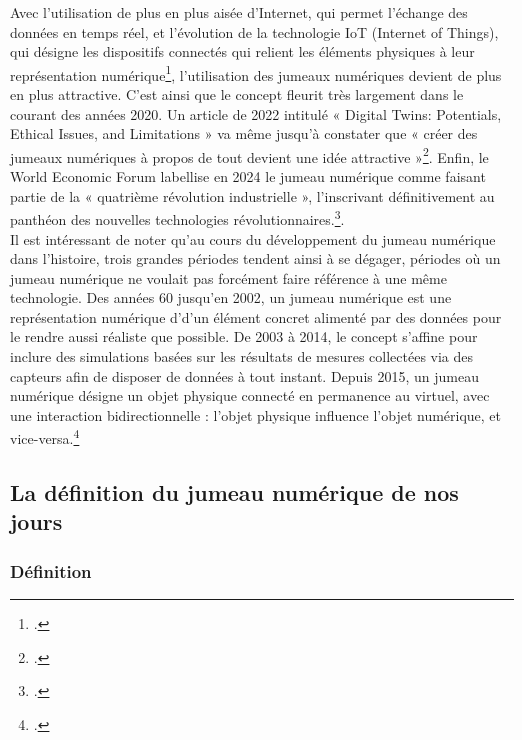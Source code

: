 Avec l'utilisation de plus en plus aisée d'Internet, qui permet l'échange des données en temps réel, et l'évolution de la technologie IoT (Internet of Things), qui désigne les dispositifs connectés qui relient les éléments physiques à leur représentation numérique\footcite{thermosJumeauNumeriqueConcept2024}, l'utilisation des jumeaux numériques devient de plus en plus attractive. C’est ainsi que le concept fleurit très largement dans le courant des années 2020. Un article de 2022 intitulé « Digital Twins: Potentials, Ethical Issues, and Limitations » va même jusqu'à constater que « créer des jumeaux numériques à propos de tout devient une idée attractive »\footcite{helbingDigitalTwinsPotentials2022}. Enfin, le World Economic Forum labellise en 2024 le jumeau numérique comme faisant partie de la « quatrième révolution industrielle », l’inscrivant définitivement au panthéon des nouvelles technologies révolutionnaires.\footcite{batagliaWhyTeamingIndustry2024}.\\

Il est intéressant de noter qu'au cours du développement du jumeau numérique dans l'histoire, trois grandes périodes tendent ainsi à se dégager, périodes où un jumeau numérique ne voulait pas forcément faire référence à une même technologie. Des années 60 jusqu’en 2002, un jumeau numérique est une représentation numérique d’d'un élément concret alimenté par des données pour le rendre aussi réaliste que possible. De 2003 à 2014, le concept s'affine pour inclure des simulations basées sur les résultats de mesures collectées via des capteurs afin de disposer de données à tout instant. Depuis 2015, un jumeau numérique désigne un objet physique connecté en permanence au virtuel, avec une interaction bidirectionnelle : l'objet physique influence l'objet numérique, et vice-versa.\footcite{grievesJumeauxNumeriquesPresentation2019}

 \subsection{La définition du jumeau numérique de nos jours}

    \subsubsection{Définition}

